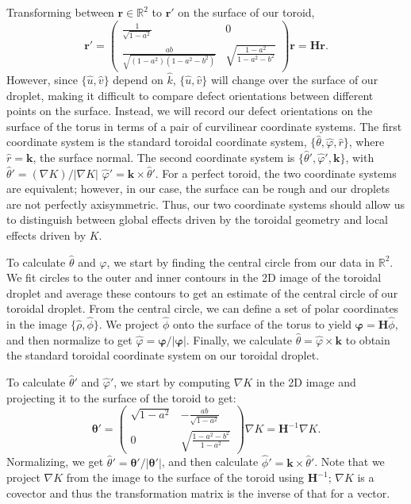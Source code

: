 Transforming between $\mathbf{r} \in \mathbb{R}^2$ to $\mathbf{r}'$ on the surface of our toroid,
\begin{equation}
  \mathbf{r}' =
  \begin{pmatrix}
  \frac{1}{\sqrt{1-a^2}} & 0 \\
  \frac{ab}{\sqrt{(1-a^2)(1-a^2-b^2)}} & \sqrt{\frac{1-a^2}{1-a^2-b^2}}
  \end{pmatrix}
  \mathbf{r} = \bm{H}\mathbf{r}.
\end{equation}
However, since $\{ \hat{u},\hat{v}\}$ depend on $\hat{k}$, $\{ \hat{u},\hat{v}\}$ will change over the surface of our droplet, making it difficult to compare defect orientations between different points on the surface.
Instead, we will record our defect orientations on the surface of the torus in terms of a pair of curvilinear coordinate systems.
The first coordinate system is the standard toroidal coordinate system, $\{\hat{\theta}, \hat{\varphi}, \hat{r}  \}$, where $\hat{r} = \mathbf{k}$, the surface normal.
The second coordinate system is $\{\hat{\theta}', \hat{\varphi}',\mathbf{k} \}$, with $\hat{\theta}' = (\nabla K)/|\nabla K|$ $\hat{\varphi}' = \mathbf{k} \times \hat{\theta}'$.
For a perfect toroid, the two coordinate systems are equivalent; however, in our case, the surface can be rough and our droplets are not perfectly axisymmetric.
Thus, our two coordinate systems should allow us to distinguish between global effects driven by the toroidal geometry and local effects driven by $K$.

To calculate $\hat{\theta}$ and $\hat{\varphi}$, we start by finding the central circle from our data in $\mathbb{R}^2$.
We fit circles to the outer and inner contours in the 2D image of the toroidal droplet and average these contours to get an estimate of the central circle of our toroidal droplet.
From the central circle, we can define a set of polar coordinates in the image $\{\hat{\rho}, \hat{\phi}\}$.
We project $\hat{\phi}$ onto the surface of the torus to yield $\bm{\varphi} = \bm{H}\hat{\phi}$, and then normalize to get $\hat{\varphi} = \bm{\varphi}/|\bm{\varphi}|$.
Finally, we calculate $\hat{\theta} =  \hat{\varphi} \times \mathbf{k}$ to obtain the standard toroidal coordinate system on our toroidal droplet.

To calculate $\hat{\theta}'$ and $\hat{\varphi}'$, we start by computing $\nabla K$ in the 2D image and projecting it to the surface of the toroid to get:
\begin{equation}
  \bm{\theta}' =
  \begin{pmatrix}
    \sqrt{1-a^2} & -\frac{ab}{\sqrt{1-a^2}} \\
    0 & \sqrt{\frac{1-a^2-b^2}{1-a^2}}
  \end{pmatrix}
  \nabla K = \bm{H}^{-1} \nabla K.
\end{equation}
Normalizing, we get $\hat{\theta}' = \bm{\theta}'/|\bm{\theta}'|$, and then calculate $\hat{\phi}' = \mathbf{k} \times \hat{\theta}'$.
Note that we project $\nabla K$ from the image to the surface of the toroid using $\bm{H}^{-1}$; $\nabla K$ is a covector and thus the transformation matrix is the inverse of that for a vector.

